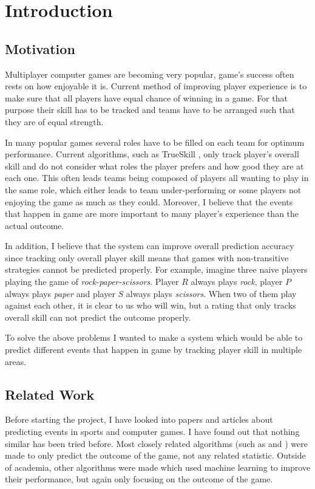\documentclass[12pt,a4paper]{report}
\begin{document}
\clearpage
\tableofcontents

\chapter{Introduction}
\section{Motivation}
Multiplayer computer games are becoming very popular, game's success often rests on how enjoyable it is.
Current method of improving player experience is to make sure that all players have equal chance of winning in a game.
For that purpose their skill has to be tracked and teams have to be arranged such that they are of equal strength.

In many popular games several roles have to be filled on each team for optimum performance.
Current algorithms, such as TrueSkill \cite{trueskill}, only track player's overall skill and do not consider what roles the player prefers and how good they are at each one.
This often leads teams being composed of players all wanting to play in the same role, which either leads to team under-performing or some players not enjoying the game as much as they could.
Moreover, I believe that the events that happen in game are more important to many player's experience than the actual outcome.

In addition, I believe that the system can improve overall prediction accuracy since tracking only overall player skill means that games with non-transitive strategies cannot be predicted properly. %
For example, imagine three naive players playing the game of \emph{rock-paper-scissors}.
Player $R$ always plays \textit{rock}, player $P$ always plays \textit{paper} and player $S$ always plays \textit{scissors}.
When two of them play against each other, it is clear to us who will win, but a rating that only tracks overall skill can not predict the outcome properly.

To solve the above problems I wanted to make a system which would be able to predict different events that happen in game by tracking player skill in multiple areas.

\section{Related Work}
Before starting the project, I have looked into papers and articles about predicting events in sports and computer games.
I have found out that nothing similar has been tried before.
Most closely related algorithms (such as \cite{trueskill} and \cite{bayesianranking}) were made to only predict the outcome of the game, not any related statistic.
Outside of academia, other algorithms were made which used machine learning to improve their performance, but again only focusing on the outcome of the game.
\end{document}
